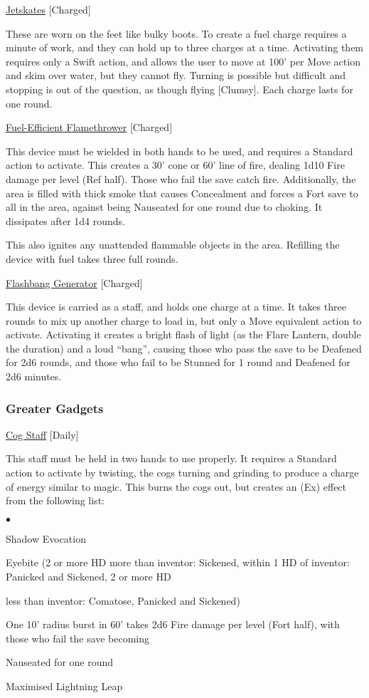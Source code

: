 \medskip\noindent\underline{Jetskates} [Charged]
 
\noindent These are worn on the feet like bulky boots. To create a fuel charge requires a minute of work, and they can hold up to three charges at a time. Activating them requires only a Swift action, and allows the user to move at 100' per Move action and skim over water, but they cannot fly. Turning is possible but difficult and stopping is out of the question, as though flying [Clumsy]. Each charge lasts for one round. 

\medskip\noindent\underline{Fuel-Efficient Flamethrower} [Charged]
 
\noindent This device must be wielded in both hands to be used, and requires a Standard action to activate. This creates a 30' cone or 60' line of fire, dealing 1d10 Fire damage per level (Ref half). Those who fail the save catch fire. Additionally, the area is filled with thick smoke that causes Concealment and forces a Fort save to all in the area, against being Nauseated for one round due to choking. It dissipates after 1d4 rounds. 

\smallskip\noindent This also ignites any unattended flammable objects in the area. Refilling the device with fuel takes three full rounds. 

\medskip\noindent\underline{Flashbang Generator} [Charged] 

\noindent This device is carried as a staff, and holds one charge at a time. It takes three rounds to mix up another charge to load in, but only a Move equivalent action to activate. Activating it creates a bright flash of light (as the Flare Lantern, double the duration) and a loud ``bang'', causing those who pass the save to be Deafened for 2d6 rounds, and those who fail to be Stunned for 1 round and Deafened for 2d6 minutes. 

\subsubsection{Greater Gadgets}

\noindent\underline{Cog Staff} [Daily]
 
\noindent This staff must be held in two hands to use properly. It requires a Standard action to activate by twisting, the cogs turning and grinding to produce a charge of energy similar to magic. This burns the cogs out, but creates an (Ex) effect from the following list:

\begin{list}{$\bullet$}{\itemspace}
\item Shadow Evocation 
\item Eyebite (2 or more HD more than inventor: Sickened, within 1 HD of inventor: Panicked and Sickened, 2 or more HD \item less than inventor: Comatose, Panicked and Sickened) 
\item One 10' radius burst in 60' takes 2d6 Fire damage per level (Fort half), with those who fail the save becoming \item Nauseated for one round 
\item Maximised Lightning Leap
\end{list}

